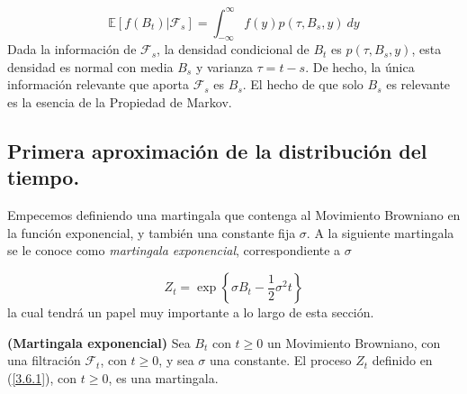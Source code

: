 \documentclass[11pt,notitlepage]{article}
\begin{document}
\begin{equation} \label{3.5.5}
    \mathbb{E}\left[f\left(B_{t}\right)|\mathcal{F}_{s}\right]=\int_{-\infty}^\infty f(y) p(\tau, B_{s},y)~dy
\end{equation}
Dada la información de \(\mathcal{F}_{s}\), la densidad condicional de \(B_{t}\) es \( p(\tau, B_{s},y)\), esta densidad es normal con media \(B_{s}\) y varianza \(\tau=t-s\). De hecho, la única información relevante que aporta \(\mathcal{F}_{s}\) es \(B_{s}\). El hecho de que solo \(B_{s}\) es relevante es la esencia de la Propiedad de Markov.


\subsection{Primera aproximación de la distribución del tiempo.}
Empecemos definiendo una martingala que contenga al Movimiento Browniano en la función exponencial, y también una constante fija \(\sigma\). A la siguiente martingala se le conoce como \textit{martingala exponencial}, correspondiente a \(\sigma\)

 \begin{equation}\label{3.6.1}
     Z_t= \exp\left\{\sigma B_t-\frac{1}{2}\sigma^2t\right\}
 \end{equation}
la cual tendrá un papel muy importante a lo largo de esta sección.\\

\begin{teor} \label{Secc1.16_Teorema1}
\textbf{(Martingala exponencial)} Sea \(B_t\) con \(t \geq 0\) un Movimiento Browniano, con una filtración \(\mathcal{F}_t\), con \(t \geq 0\), y sea \(\sigma\) una constante. El proceso \(Z_t\) definido en (\ref{3.6.1}), con \(t \geq 0\), es una martingala.
\end{teor}
\end{document}
